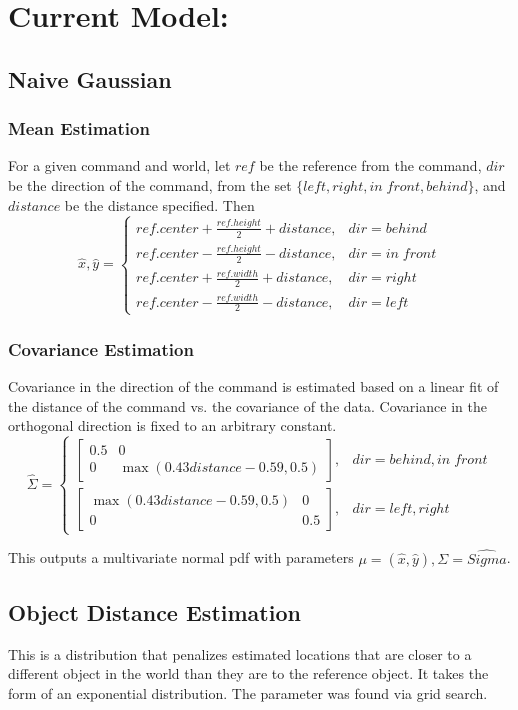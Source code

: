 \documentclass[12pt,letterpaper]{article}
\begin{document}
\section*{Current Model:}

\subsection{Naive Gaussian}
\subsubsection*{Mean Estimation}
For a given command and world, let $ref$ be the reference from the command, $dir$ be the direction of the command, from the set $\{left, right, in\;front, behind\}$, and $distance$ be the distance specified. Then
\[
\hat{x}, \hat{y} = \begin{cases} ref.center + \frac{ref.height}{2} + distance, & dir = behind \\
ref.center - \frac{ref.height}{2} - distance, & dir = in\;front \\
 ref.center + \frac{ref.width}{2} + distance, & dir = right \\
 ref.center - \frac{ref.width}{2} - distance, & dir = left \end{cases}
\]

\subsubsection*{Covariance Estimation}
Covariance in the direction of the command is estimated based on a linear fit of the distance of the command vs. the covariance of the data. Covariance in the orthogonal direction is fixed to an arbitrary constant.
\[
\hat{\Sigma} = \begin{cases}
\begin{bmatrix} 0.5 & 0 \\ 0 & \max(0.43distance - 0.59, 0.5) \end{bmatrix}, & dir = behind, in\;front\\
\begin{bmatrix} \max(0.43distance - 0.59, 0.5) & 0 \\ 0 & 0.5 \end{bmatrix}, & dir = left, right
\end{cases}
\]

This outputs a multivariate normal pdf with parameters $\mu = (\hat{x}, \hat{y}), \Sigma = \hat{Sigma}$.

\subsection{Object Distance Estimation}
This is a distribution that penalizes estimated locations that are closer to a different object in the world than they are to the reference object. It takes the form of an exponential distribution. The parameter was found via grid search.
\end{document}
